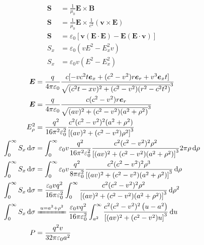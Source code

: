 \begin{align*}
    \boldsymbol{S}&=\frac{1}{\mu_0}\boldsymbol{E}\times\boldsymbol{B}\\
    \boldsymbol{S}&=\frac{1}{\mu_0}\boldsymbol{E}\times \frac{1}{c^2} (\boldsymbol{v} \times \boldsymbol{E})\\
    \boldsymbol{S} &= \varepsilon_0 \left[ \boldsymbol{v}(\boldsymbol{E} \cdot \boldsymbol{E}) - \boldsymbol{E}(\boldsymbol{E} \cdot \boldsymbol{v}) \right]\\
    S_x&= \varepsilon_0 \left( vE^2 - E_x^2 v \right)\\
    S_x&= \varepsilon_0 v\left( E^2 - E_x^2  \right)
\end{align*}
\begin{align*}
    \boldsymbol{E} &= \frac{q}{4\pi\varepsilon_0} \frac{c[-vc^2t\boldsymbol{e}_x+(c^2-v^2)r\boldsymbol{e}_r+v^3\boldsymbol{e}_xt]}{\sqrt{(c^2t-xv)^2+(c^2-v^2)(r^2-c^2t^2)}^3}\\
    \boldsymbol{E} &= \frac{q}{4\pi\varepsilon_0} \frac{c(c^2-v^2)r\boldsymbol{e}_r}{\sqrt{(av)^2+(c^2-v^2)(a^2+\rho^2)}^3}\\
    E_\rho^2&=\frac{q^2}{16\pi^2\varepsilon_0^2} \frac{c^2(c^2-v^2)^2(a^2+\rho^2)}{\left[(av)^2+(c^2-v^2)\rho^2\right]^3}\\
    \int_{0}^{\infty}S_x\dif\sigma&=
    \int_{0}^{\infty}\varepsilon_0 v\frac{q^2}{16\pi^2\varepsilon_0^2} \frac{c^2(c^2-v^2)^2\rho^2}{\left[(av)^2+(c^2-v^2)(a^2+\rho^2)\right]^3}2\pi\rho\dif\rho\\
    \int_{0}^{\infty}S_x\dif\sigma&=
    \int_{0}^{\infty}\varepsilon_0 v\frac{q^2}{8\pi\varepsilon_0^2} \frac{c^2(c^2-v^2)^2\rho^3}{\left[(av)^2+(c^2-v^2)(a^2+\rho^2)\right]^3}\dif\rho\\
    \int_{0}^{\infty}S_x\dif\sigma&=
    \frac{\varepsilon_0 vq^2}{16\pi\varepsilon_0^2}\int_{0}^{\infty} \frac{c^2(c^2-v^2)^2\rho^2}{\left[(av)^2+(c^2-v^2)(a^2+\rho^2)\right]^3}\dif\rho^2\\
    \int_{0}^{\infty}S_x\dif\sigma&\xlongequal{u=a^2+\rho^2}
    \frac{\varepsilon_0 vq^2}{16\pi\varepsilon_0^2}\int_{a^2}^{\infty} \frac{c^2(c^2-v^2)^2\left(u-a^2\right)}{\left[(av)^2+(c^2-v^2)u\right]^3}\dif u\\
    P &= \frac{q^2 v}{32 \pi \varepsilon_0 a^2}
\end{align*}
\newpage
